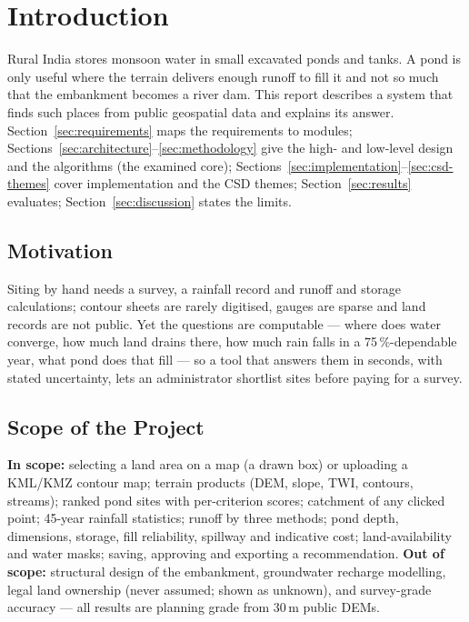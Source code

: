 \documentclass[manuscript,screen,review]{acmart}
\begin{document}
\section{Introduction}
\label{sec:intro}
Rural India stores monsoon water in small excavated ponds and tanks. A pond is only useful
where the terrain delivers enough runoff to fill it and not so much that the embankment
becomes a river dam. This report describes a system that finds such places from public
geospatial data and explains its answer. Section~\ref{sec:requirements} maps the requirements to
modules; Sections~\ref{sec:architecture}--\ref{sec:methodology} give the high- and low-level design and the
algorithms (the examined core); Sections~\ref{sec:implementation}--\ref{sec:csd-themes} cover implementation
and the CSD themes; Section~\ref{sec:results} evaluates; Section~\ref{sec:discussion} states the
limits.

\subsection{Motivation}
Siting by hand needs a survey, a rainfall record and runoff and storage calculations;
contour sheets are rarely digitised, gauges are sparse and land records are not public. Yet
the questions are computable --- where does water converge, how much land drains there, how
much rain falls in a 75\,\%-dependable year, what pond does that fill --- so a tool that
answers them in seconds, with stated uncertainty, lets an administrator shortlist sites
before paying for a survey.

\subsection{Scope of the Project}
\textbf{In scope:} selecting a land area on a map (a drawn box) or uploading a KML/KMZ
contour map; terrain products (DEM, slope, TWI, contours, streams); ranked pond sites with
per-criterion scores; catchment of any clicked point; 45-year rainfall statistics; runoff by
three methods; pond depth, dimensions, storage, fill reliability, spillway and indicative
cost; land-availability and water masks; saving, approving and exporting a recommendation.
\textbf{Out of scope:} structural design of the embankment, groundwater recharge modelling,
legal land ownership (never assumed; shown as unknown), and survey-grade accuracy --- all
results are planning grade from 30\,m public DEMs.

\end{document}
